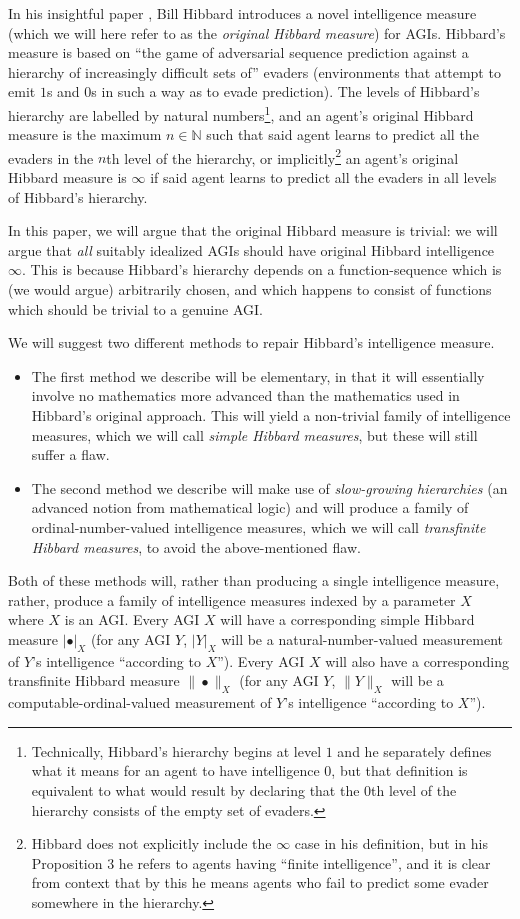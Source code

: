 \documentclass{article}
\begin{document}
In his insightful paper \cite{hibbard}, Bill Hibbard introduces a novel
intelligence measure (which we will here refer to as the \emph{original Hibbard measure})
for AGIs.
Hibbard's measure is based on ``the game of adversarial sequence prediction
against a hierarchy of increasingly difficult sets of'' evaders (environments that attempt
to emit $1$s and $0$s in such a way as to evade prediction).
The levels of Hibbard's hierarchy are labelled by natural numbers\footnote{Technically,
Hibbard's hierarchy begins at level $1$ and he separately defines what it means for
an agent to have intelligence $0$, but that definition is equivalent to what would result
by declaring that the $0$th level of the hierarchy consists of the empty set of evaders.}, and
an agent's original Hibbard measure is the maximum $n\in\mathbb N$ such that
said agent learns to predict all the evaders in the $n$th level of the hierarchy,
or implicitly\footnote{Hibbard does not explicitly include the $\infty$ case in his
definition, but in his Proposition 3 he refers to agents having ``finite intelligence'', and
it is clear from context that by this he means agents who fail to predict some evader
somewhere in the hierarchy.} an agent's original Hibbard measure is $\infty$
if said agent learns to predict all the evaders in all levels of Hibbard's hierarchy.

In this paper, we will argue that the original Hibbard measure is
trivial: we will argue that \emph{all} suitably idealized AGIs should have
original Hibbard intelligence $\infty$. This is because Hibbard's hierarchy
depends on a function-sequence which is (we would argue) arbitrarily chosen,
and which happens to consist of functions which should be trivial to a genuine AGI.

We will suggest two different methods to repair Hibbard's intelligence measure.
\begin{itemize}
    \item
    The first method we describe will be elementary, in that it will
    essentially involve
    no mathematics more advanced than the mathematics used in Hibbard's original approach.
    This will yield a non-trivial family of intelligence measures,
    which we will call \emph{simple Hibbard measures}, but these will still suffer a flaw.
    \item
    The second method we describe will make use of \emph{slow-growing hierarchies}
    \cite{weiermann2002slow} (an advanced notion from mathematical logic) and will
    produce a family of ordinal-number-valued intelligence measures, which we will
    call \emph{transfinite Hibbard measures}, to avoid the above-mentioned flaw.
\end{itemize}
Both of these methods will, rather than producing a single intelligence measure,
rather, produce a family of intelligence measures indexed by a parameter $X$ where
$X$ is an AGI.
Every AGI $X$ will have a corresponding simple Hibbard measure $|\bullet|_X$
(for any AGI $Y$, $|Y|_X$ will be a natural-number-valued measurement of $Y$'s intelligence
``according to $X$'').
Every AGI $X$ will also have a corresponding transfinite Hibbard measure
$\|\bullet\|_X$
(for any AGI $Y$, $\|Y\|_X$ will be a computable-ordinal-valued measurement of $Y$'s
intelligence ``according to $X$'').
\end{document}
